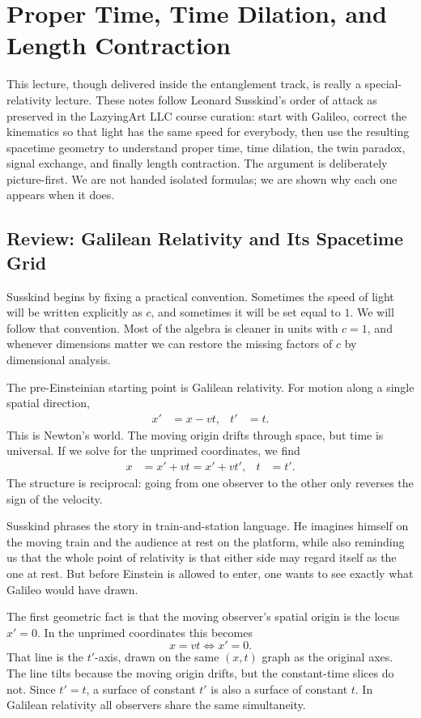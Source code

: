 \chapter{Proper Time, Time Dilation, and Length Contraction}

This lecture, though delivered inside the entanglement track, is really a special-relativity lecture. These notes follow Leonard Susskind's order of attack as preserved in the LazyingArt LLC course curation: start with Galileo, correct the kinematics so that light has the same speed for everybody, then use the resulting spacetime geometry to understand proper time, time dilation, the twin paradox, signal exchange, and finally length contraction. The argument is deliberately picture-first. We are not handed isolated formulas; we are shown why each one appears when it does.

\section{Review: Galilean Relativity and Its Spacetime Grid}

Susskind begins by fixing a practical convention. Sometimes the speed of light will be written explicitly as \(c\), and sometimes it will be set equal to \(1\). We will follow that convention. Most of the algebra is cleaner in units with \(c=1\), and whenever dimensions matter we can restore the missing factors of \(c\) by dimensional analysis.

The pre-Einsteinian starting point is Galilean relativity. For motion along a single spatial direction,
\begin{align}
x' &= x-vt, &
t' &= t.
\end{align}
This is Newton's world. The moving origin drifts through space, but time is universal. If we solve for the unprimed coordinates, we find
\begin{align}
x &= x'+vt = x'+vt', &
t &= t'.
\end{align}
The structure is reciprocal: going from one observer to the other only reverses the sign of the velocity.

Susskind phrases the story in train-and-station language. He imagines himself on the moving train and the audience at rest on the platform, while also reminding us that the whole point of relativity is that either side may regard itself as the one at rest. But before Einstein is allowed to enter, one wants to see exactly what Galileo would have drawn.

The first geometric fact is that the moving observer's spatial origin is the locus \(x'=0\). In the unprimed coordinates this becomes
\begin{equation}
x=vt \iff x'=0.
\end{equation}
That line is the \(t'\)-axis, drawn on the same \((x,t)\) graph as the original axes. The line tilts because the moving origin drifts, but the constant-time slices do not. Since \(t'=t\), a surface of constant \(t'\) is also a surface of constant \(t\). In Galilean relativity all observers share the same simultaneity.

